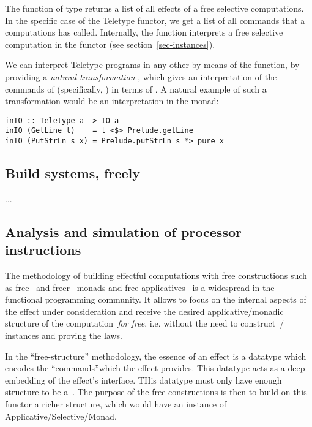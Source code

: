 The  function of type 
returns a list of all effects of a free selective computations. In the specific case of
the Teletype functor, we get a list of all commands that a computations has called.
Internally, the  function interprets a free selective computation
in the  functor (see section~\ref{sec-instances}).

We can interpret Teletype programs in any other  by means of the
 function, by providing a \emph{natural transformation} , which gives an interpretation of the commands of
 (specifically, ) in terms of . A natural example of such a
transformation would be an interpretation in the  monad:

\begin{verbatim}
inIO :: Teletype a -> IO a
inIO (GetLine t)    = t <$> Prelude.getLine
inIO (PutStrLn s x) = Prelude.putStrLn s *> pure x
\end{verbatim}

\subsection{Build systems, freely}

...

\subsection{Analysis and simulation of processor instructions}

The methodology of building effectful computations with free constructions such
as free~\cite{free-monads} and freer~\cite{freer-monads} monads and free
applicatives~\cite{free-applicatives} is a widespread in the functional programming community.
It allows to focus on the internal aspects of the effect under consideration and receive the
desired applicative/monadic structure of the computation~\emph{for free}, i.e. without the need
to construct~/~ instances and proving the laws.

In the ``free-structure'' methodology, the essence of an effect is a datatype which encodes
the ``commands''which the effect provides. This datatype acts as a deep embedding of the effect's
interface. THis datatype must only have enough structure to be a~. The purpose of
the free constructions is then to build on this functor a richer structure, which would have
an instance of Applicative/Selective/Monad.

